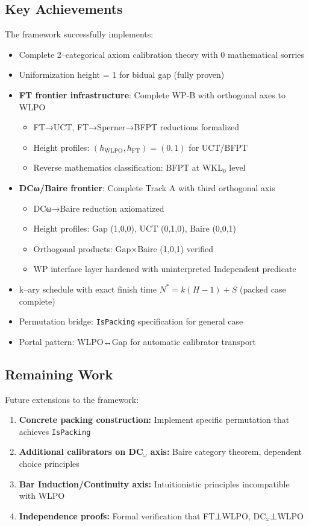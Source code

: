 \documentclass[11pt]{article}
\theoremstyle{definition}
\theoremstyle{remark}
\begin{document}
\subsection{Key Achievements}
The framework successfully implements:
\begin{itemize}
\item Complete 2--categorical axiom calibration theory with 0 mathematical sorries
\item Uniformization height = 1 for bidual gap (fully proven)
\item \textbf{FT frontier infrastructure}: Complete WP-B with orthogonal axes to WLPO
  \begin{itemize}
  \item FT→UCT, FT→Sperner→BFPT reductions formalized
  \item Height profiles: $(h_{\text{WLPO}}, h_{\text{FT}}) = (0, 1)$ for UCT/BFPT
  \item Reverse mathematics classification: BFPT at WKL$_0$ level \cite{Hirst-BFPT}
  \end{itemize}
\item \textbf{DCω/Baire frontier}: Complete Track A with third orthogonal axis
  \begin{itemize}
  \item DCω→Baire reduction axiomatized
  \item Height profiles: Gap (1,0,0), UCT (0,1,0), Baire (0,0,1)
  \item Orthogonal products: Gap×Baire (1,0,1) verified
  \item WP interface layer hardened with uninterpreted Independent predicate
  \end{itemize}
\item k--ary schedule with exact finish time $N^* = k(H-1) + S$ (packed case complete)
\item Permutation bridge: \texttt{IsPacking} specification for general case
\item Portal pattern: WLPO↔Gap for automatic calibrator transport
\end{itemize}

\subsection{Remaining Work}
Future extensions to the framework:
\begin{enumerate}
\item \textbf{Concrete packing construction:} Implement specific permutation that achieves \texttt{IsPacking}
\item \textbf{Additional calibrators on DC$_\omega$ axis:} Baire category theorem, dependent choice principles
\item \textbf{Bar Induction/Continuity axis:} Intuitionistic principles incompatible with WLPO
\item \textbf{Independence proofs:} Formal verification that FT⊥WLPO, DC$_\omega$⊥WLPO
\end{enumerate}
\end{document}
